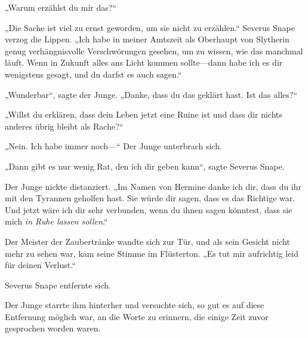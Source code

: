 „Warum erzählst du mir das?“

„Die Sache ist viel zu ernst geworden, um sie nicht zu erzählen.“
Severus Snape verzog die Lippen.
„Ich habe in meiner Amtszeit als Oberhaupt von Slytherin genug verhängnisvolle Verschwörungen gesehen, um zu wissen, wie das manchmal läuft. Wenn in Zukunft alles ans Licht kommen sollte—dann habe ich es dir wenigstens gesagt, und du darfst es auch sagen.“

„Wunderbar“, sagte der Junge. „Danke, dass du das geklärt hast. Ist das alles?“

„Willst du erklären, dass dein Leben jetzt eine Ruine ist und dass dir nichts anderes übrig bleibt als Rache?“

„Nein. Ich habe immer noch—“
Der Junge unterbrach sich.

„Dann gibt es nur wenig Rat, den ich dir geben kann“, sagte Severus Snape.

Der Junge nickte distanziert.
„Im Namen von Hermine danke ich dir, dass du ihr mit den Tyrannen geholfen hast. Sie würde dir sagen, dass es das Richtige war. Und jetzt wäre ich dir sehr verbunden, wenn du ihnen sagen könntest, dass sie mich \emph{in Ruhe lassen sollen}.“

Der Meister der Zaubertränke wandte sich zur Tür, und als sein Gesicht nicht mehr zu sehen war, kam seine Stimme im Flüsterton.
„Es tut mir aufrichtig leid für deinen Verlust.“

Severus Snape entfernte sich.

Der Junge starrte ihm hinterher und versuchte sich, so gut es auf diese Entfernung möglich war, an die Worte zu erinnern, die einige Zeit zuvor gesprochen worden waren.

